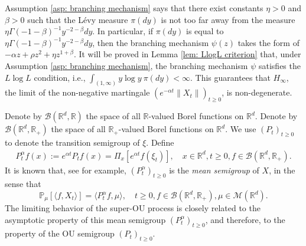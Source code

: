 \documentclass[12pt,a4paper]{amsart}
\theoremstyle{plain}
\theoremstyle{definition}
\numberwithin{equation}{section}
\begin{document}
Assumption \ref{asp: branching mechanism} says that there exist constants $\eta>0$ and $\beta > 0$ such that the L\'evy measure $\pi(dy)$ is not too far away from the measure $\eta \Gamma(-1-\beta)^{-1}y^{-2-\beta} dy$.
In particular, if $\pi(dy)$ is equal to $\eta \Gamma(-1-\beta)^{-1}y^{-2-\beta} dy$, then the branching mechanism $\psi(z)$ takes the form of $-\alpha z + \rho z^2 + \eta z^{1+\beta}$.
It will be proved in Lemma \ref{lem: LlogL criterion} that, under Assumption \ref{asp: branching mechanism}, the branching mechanism $\psi$ satisfies the $L \log L$ condition, i.e., $ \int_{(1,\infty)} y\log y~\pi(dy) < \infty. $
This guarantees that $H_\infty$, the limit of the non-negative martingale $(e^{-\alpha t} \|X_t\|)_{t\geq 0}$, is non-degenerate.

Denote by $\mathcal B(\mathbb R^d, \mathbb R)$ the space of all $\mathbb R$-valued Borel functions on $\mathbb R^d$.
Denote by $\mathcal B(\mathbb R^d, \mathbb R_+)$ the space of all $\mathbb R_+$-valued Borel functions on $\mathbb R^d$.
We use  $(P_t)_{t\geq 0}$ to denote the transition semigroup of $\xi$.	
Define
\begin{align}
  \label{eq: meansemigroup}
  P^{\alpha}_t f(x)
  :=
  e^{\alpha t} P_t f(x)
  = \Pi_x [e^{\alpha t}f(\xi_t)]
  , \quad x\in \mathbb R^d,t\geq 0, f\in \mathcal B(\mathbb R^d, \mathbb R_+).
\end{align}
It is known that, see \cite[Proposition 2.27]{Li2011Measure-valued} for example, $(P^\alpha_t)_{t\geq 0}$ is the \emph{mean semigroup} of $X$, in the sense that
\begin{equation}
  \mathbb{P}_{\mu}[\langle f, X_t \rangle]
  = \langle P^\alpha_t f, \mu \rangle,
  \quad t\geq 0, f\in \mathcal B(\mathbb R^d, \mathbb R_+), \mu \in \mathcal M(\mathbb R^d).
\end{equation}
The limiting behavior of the super-OU process is closely related to the asymptotic property of this mean semigroup $(P^\alpha_t)_{t\geq 0}$, and therefore, to the property of the OU semigroup $(P_t)_{t\geq 0}$.
\end{document}
